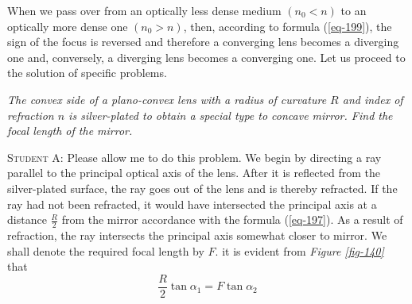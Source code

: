 \documentclass[a4paper,sfsidenotes]{tufte-book}
\begin{document}
When we pass over from an optically less dense medium $(n_{0}<n)$ to an optically more dense one $(n_{0}>n)$, then, according to formula (\ref{eq-199}), the sign of the focus is reversed and therefore a converging lens becomes a diverging one and, conversely, a diverging lens becomes a converging one. Let us proceed to the solution of specific problems. 

\emph{The convex side of a plano-convex lens with a radius of curvature $R$ and index of refraction $n$ is silver-plated to obtain a special type to concave mirror. Find the focal length of the mirror.}

\textsc{Student A:} Please allow me to do this problem. We begin by directing a ray parallel to the principal optical axis of the lens. After it is reflected from the silver-plated surface, the ray goes out of the lens and is thereby refracted. If the ray had not been refracted, it would have intersected the principal axis at a distance $\frac{R}{2}$ from the mirror accordance with the formula (\ref{eq-197}). As a result of refraction, the ray intersects the principal axis somewhat closer to mirror. We shall denote the required focal length by $F$. it is evident from \emph{Figure \ref{fig-140}} that 
\begin{equation*}%
\frac{R}{2} \tan \alpha_{1} = F \tan \alpha_{2}
\end{equation*}
\end{document}
